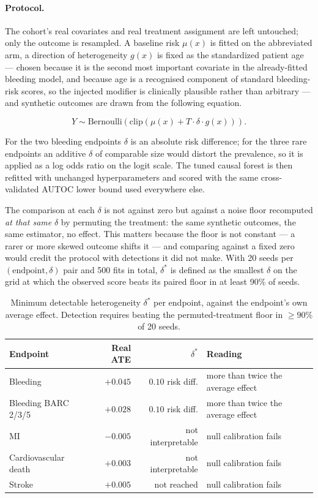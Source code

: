 \paragraph{Protocol.}
The cohort's real covariates and real treatment assignment are left untouched;
only the outcome is resampled. A baseline risk $\mu(x)$ is fitted on the
abbreviated arm, a direction of heterogeneity $g(x)$ is fixed as the
standardized patient age — chosen because it is the second most important
covariate in the already-fitted bleeding model, and because age is a recognised
component of standard bleeding-risk scores, so the injected modifier is
clinically plausible rather than arbitrary — and synthetic outcomes are drawn
from the following equation.

\begin{equation}
Y \sim \mathrm{Bernoulli}\!\left(
\mathrm{clip}\!\left(\mu(x) + T \cdot \delta \cdot g(x)\right)
\right).
\end{equation}

For the two bleeding endpoints $\delta$ is an absolute risk
difference; for the three rare endpoints an additive $\delta$ of comparable
size would distort the prevalence, so it is applied as a log odds ratio on the
logit scale. The tuned causal forest is then refitted with unchanged
hyperparameters and scored with the same cross-validated AUTOC lower bound used
everywhere else.

The comparison at each $\delta$ is not against zero but against a noise floor
recomputed \emph{at that same} $\delta$ by permuting the treatment: the same
synthetic outcomes, the same estimator, no effect. This matters because the
floor is not constant — a rarer or more skewed outcome shifts it — and
comparing against a fixed zero would credit the protocol with detections it did
not make. With 20 seeds per $(\text{endpoint}, \delta)$ pair and 500 fits in
total, $\delta^*$ is defined as the smallest $\delta$ on the grid at which the
observed score beats its paired floor in at least 90\% of seeds.

\begin{table}[H]
\centering
\caption{Minimum detectable heterogeneity $\delta^*$ per endpoint, against the
endpoint's own average effect. Detection requires beating the permuted-treatment
floor in $\geq 90\%$ of 20 seeds.}
\label{tab:delta-star}
\begin{tabular}{lrrl}
\toprule
Endpoint & Real ATE & $\delta^*$ & Reading \\
\midrule
Bleeding             & $+0.045$ & $0.10$ risk diff. & more than twice the average effect \\
Bleeding BARC 2/3/5  & $+0.028$ & $0.10$ risk diff. & more than twice the average effect \\
MI                   & $-0.005$ & not interpretable & null calibration fails \\
Cardiovascular death & $+0.003$ & not interpretable & null calibration fails \\
Stroke               & $+0.005$ & not reached & null calibration fails \\
\bottomrule
\end{tabular}
\end{table}

